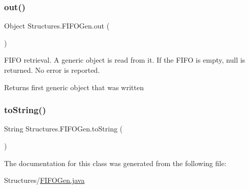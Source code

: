\mbox{\label{class_structures_1_1_f_i_f_o_gen_ac21638f2f22f36450c241d5f5dc665bb}} 
\subsubsection{\texorpdfstring{out()}{out()}}
{\footnotesize\ttfamily Object Structures.\+F\+I\+F\+O\+Gen.\+out (\begin{DoxyParamCaption}{ }\end{DoxyParamCaption})}

F\+I\+FO retrieval. A generic object is read from it. If the F\+I\+FO is empty, {\ttfamily null} is returned. No error is reported.

\begin{DoxyReturn}{Returns}
first generic object that was written 
\end{DoxyReturn}
\mbox{\label{class_structures_1_1_f_i_f_o_gen_a89179a1589f53d69033309e302df2d4e}} 
\subsubsection{\texorpdfstring{to\+String()}{toString()}}
{\footnotesize\ttfamily String Structures.\+F\+I\+F\+O\+Gen.\+to\+String (\begin{DoxyParamCaption}{ }\end{DoxyParamCaption})}



The documentation for this class was generated from the following file\+:\begin{DoxyCompactItemize}
\item 
Structures/\hyperlink{_f_i_f_o_gen_8java}{F\+I\+F\+O\+Gen.\+java}\end{DoxyCompactItemize}
